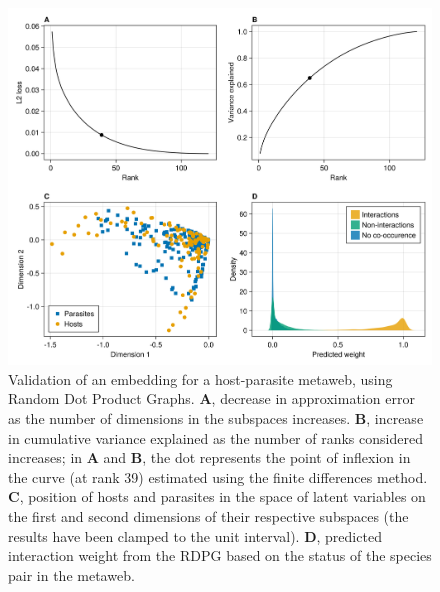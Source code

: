 \begin{figure}[h]
    \centering
    \includegraphics[width=\textwidth]{figures/illustration-part1.png}
    \caption{Validation of an embedding for a host-parasite metaweb, using
Random Dot Product Graphs. \textbf{A}, decrease in approximation error
as the number of dimensions in the subspaces increases. \textbf{B},
increase in cumulative variance explained as the number of ranks
considered increases; in \textbf{A} and \textbf{B}, the dot represents
the point of inflexion in the curve (at rank 39) estimated using the
finite differences method. \textbf{C}, position of hosts and parasites
in the space of latent variables on the first and second dimensions of
their respective subspaces (the results have been clamped to the unit
interval). \textbf{D}, predicted interaction weight from the RDPG based
on the status of the species pair in the
metaweb.}
    \label{fig:illustration1}
\end{figure}


